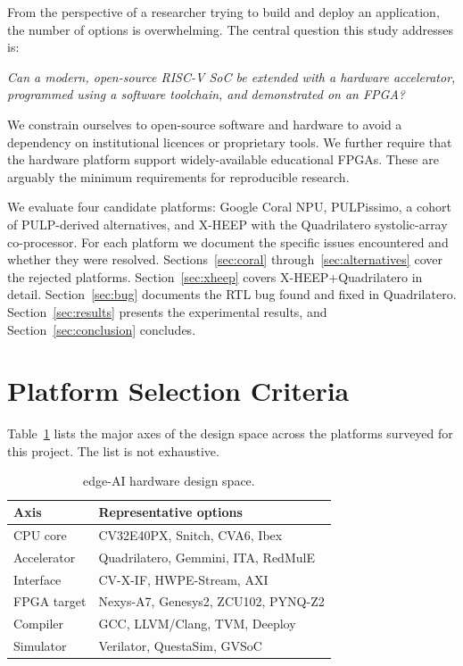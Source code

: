 \documentclass[journal]{IEEEtran}
\begin{document}
From the perspective of a researcher trying to build and deploy an application, the number of options is
overwhelming. The central question this study addresses is:

\emph{Can a modern, open-source RISC-V SoC be
extended with a hardware accelerator, programmed using a software toolchain,
and demonstrated on an FPGA?}

We constrain ourselves to open-source software and hardware to avoid a dependency on institutional
licences or proprietary tools. We further require that the hardware platform support widely-available
educational FPGAs. These are arguably the minimum requirements for reproducible research.

We evaluate four candidate platforms: Google Coral NPU,
PULPissimo, a cohort of PULP-derived alternatives, and X-HEEP with
the Quadrilatero systolic-array co-processor. For each platform we document the
specific issues encountered and whether they were resolved. Sections~\ref{sec:coral}
through~\ref{sec:alternatives} cover the rejected platforms.
Section~\ref{sec:xheep} covers X-HEEP+Quadrilatero in detail.
Section~\ref{sec:bug} documents the RTL bug found and fixed in Quadrilatero.
Section~\ref{sec:results} presents the experimental results, and
Section~\ref{sec:conclusion} concludes.

\section{Platform Selection Criteria}
\label{sec:criteria}

Table~\ref{tab:designspace} lists the major axes of the design space across the platforms
surveyed for this project. The list is not exhaustive.

\begin{table}[htbp]
  \centering
  \caption{edge-AI hardware design space.}
  \label{tab:designspace}
  \begin{tabular}{@{}ll@{}}
    \toprule
    \textbf{Axis} & \textbf{Representative options} \\
    \midrule
    CPU core      & CV32E40PX, Snitch, CVA6, Ibex \\
    Accelerator   & Quadrilatero, Gemmini, ITA, RedMulE \\
    Interface     & CV-X-IF, HWPE-Stream, AXI \\
    FPGA target   & Nexys-A7, Genesys2, ZCU102, PYNQ-Z2 \\
    Compiler      & GCC, LLVM/Clang, TVM, Deeploy \\
    Simulator     & Verilator, QuestaSim, GVSoC \\
    \bottomrule
  \end{tabular}
\end{table}
\end{document}

